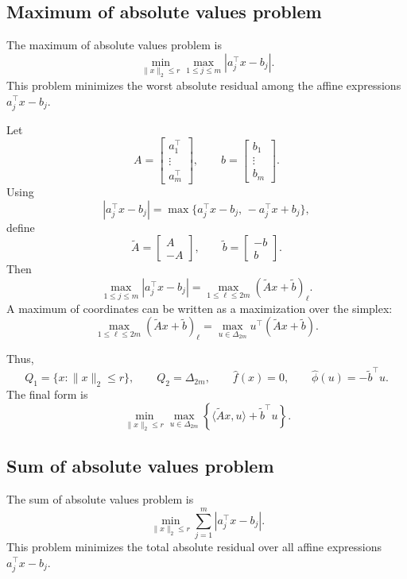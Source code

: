 \documentclass[11pt]{article}
\begin{document}
\subsection{Maximum of absolute values problem}

The maximum of absolute values problem is
\[
    \min_{\|x\|_2\le r}
    \max_{1\le j\le m}|a_j^\top x-b_j|.
\]
This problem minimizes the worst absolute residual among the affine expressions
\(a_j^\top x-b_j\).

Let
\[
    A=
    \begin{bmatrix}
        a_1^\top\\
        \vdots\\
        a_m^\top
    \end{bmatrix},
    \qquad
    b=
    \begin{bmatrix}
        b_1\\
        \vdots\\
        b_m
    \end{bmatrix}.
\]
Using
\[
    |a_j^\top x-b_j|
    =
    \max\{a_j^\top x-b_j,\,-a_j^\top x+b_j\},
\]
define
\[
    \widetilde A=
    \begin{bmatrix}
        A\\
        -A
    \end{bmatrix},
    \qquad
    \widetilde b=
    \begin{bmatrix}
        -b\\
        b
    \end{bmatrix}.
\]
Then
\[
    \max_{1\le j\le m}|a_j^\top x-b_j|
    =
    \max_{1\le \ell\le 2m}
    (\widetilde A x+\widetilde b)_\ell.
\]
A maximum of coordinates can be written as a maximization over the simplex:
\[
    \max_{1\le \ell\le 2m}
    (\widetilde A x+\widetilde b)_\ell
    =
    \max_{u\in\Delta_{2m}}
    u^\top(\widetilde A x+\widetilde b).
\]

Thus,
\[
    Q_1=\{x:\|x\|_2\le r\},
    \qquad
    Q_2=\Delta_{2m},
    \qquad
    \hat f(x)=0,
    \qquad
    \hat\phi(u)=-\widetilde b^\top u.
\]
The final form is
\[
    \boxed{
    \min_{\|x\|_2\le r}
    \max_{u\in\Delta_{2m}}
    \left\{
        \langle \widetilde A x,u\rangle
        +
        \widetilde b^\top u
    \right\}.
    }
\]

\subsection{Sum of absolute values problem}

The sum of absolute values problem is
\[
    \min_{\|x\|_2\le r}
    \sum_{j=1}^{m}|a_j^\top x-b_j|.
\]
This problem minimizes the total absolute residual over all affine expressions
\(a_j^\top x-b_j\).
\end{document}
